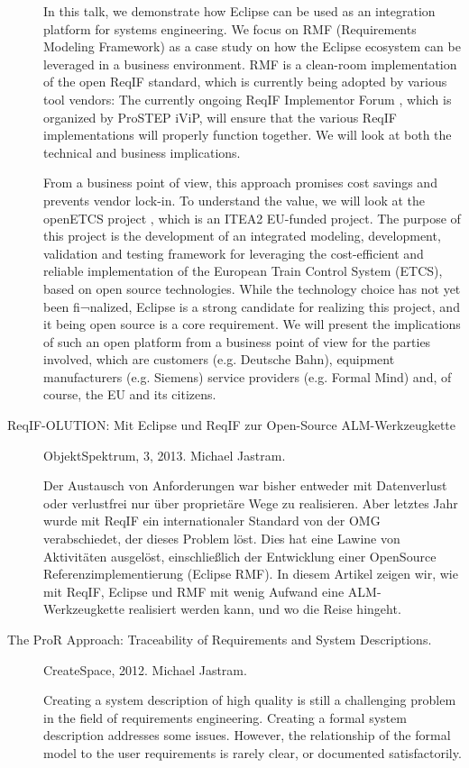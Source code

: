 \begin{description}
In this talk, we demonstrate how Eclipse can be used as an integration platform for systems engineering. We focus on RMF (Requirements Modeling Framework) as a case study on how the Eclipse ecosystem can be leveraged in a business environment. RMF is a clean-room implementation of the open ReqIF standard, which is currently being adopted by various tool vendors: The currently ongoing ReqIF Implementor Forum , which is organized by ProSTEP iViP, will ensure that the various ReqIF implementations will properly function together. We will look at both the technical and business implications.

From a business point of view, this approach promises cost savings and prevents vendor lock-in. To understand the value, we will look at the openETCS project , which is an ITEA2 EU-funded project. The purpose of this project is the development of an integrated modeling, development, validation and testing framework for leveraging the cost-efficient and reliable implementation of the European Train Control System (ETCS), based on open source technologies. While the technology choice has not yet been fi¬nalized, Eclipse is a strong candidate for realizing this project, and it being open source is a core requirement. We will present the implications of such an open platform from a business point of view for the parties involved, which are customers (e.g. Deutsche Bahn), equipment manufacturers (e.g. Siemens) service providers (e.g. Formal Mind) and, of course, the EU and its citizens.

\item[ReqIF-OLUTION: Mit Eclipse und ReqIF zur Open-Source ALM-Werkzeugkette] ObjektSpektrum, 3, 2013. Michael Jastram.

Der Austausch von Anforderungen war bisher entweder mit Datenverlust oder verlustfrei nur über proprietäre Wege zu realisieren. Aber letztes Jahr wurde mit ReqIF ein internationaler Standard von der OMG verabschiedet, der dieses Problem löst. Dies hat eine Lawine von Aktivitäten ausgelöst, einschließlich der Entwicklung einer OpenSource Referenzimplementierung (Eclipse RMF). In diesem Artikel zeigen wir, wie mit ReqIF, Eclipse und RMF mit wenig Aufwand eine ALM-Werkzeugkette realisiert werden kann, und wo die Reise hingeht.

\item[The ProR Approach: Traceability of Requirements and System Descriptions.] CreateSpace, 2012. Michael Jastram.

Creating a system description of high quality is still a challenging problem in the field of requirements engineering. Creating a formal system description addresses some issues. However, the relationship of the formal model to the user requirements is rarely clear, or documented satisfactorily.


\end{description}
